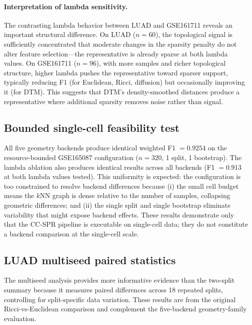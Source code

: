 \documentclass[11pt]{article}
\begin{document}
\paragraph{Interpretation of lambda sensitivity.}
The contrasting lambda behavior between LUAD and GSE161711 reveals an important structural difference.
On LUAD ($n = 60$), the topological signal is sufficiently concentrated that moderate changes in the sparsity penalty do not alter feature selection---the representative is already sparse at both lambda values.
On GSE161711 ($n = 96$), with more samples and richer topological structure, higher lambda pushes the representative toward sparser support, typically reducing F1 (for Euclidean, Ricci, diffusion) but occasionally improving it (for DTM).
This suggests that DTM's density-smoothed distances produce a representative where additional sparsity removes noise rather than signal.

\subsection{Bounded single-cell feasibility test}

All five geometry backends produce identical weighted F1 $= 0.9254$ on the resource-bounded GSE165087 configuration ($n = 320$, 1 split, 1 bootstrap).
The lambda ablation also produces identical results across all backends (F1 $= 0.913$ at both lambda values tested).
This uniformity is expected: the configuration is too constrained to resolve backend differences because (i) the small cell budget means the $k$NN graph is dense relative to the number of samples, collapsing geometric differences; and (ii) the single split and single bootstrap eliminate variability that might expose backend effects.
These results demonstrate only that the CC-SPR pipeline is executable on single-cell data; they do not constitute a backend comparison at the single-cell scale.

\subsection{LUAD multiseed paired statistics}

The multiseed analysis provides more informative evidence than the two-split summary because it measures paired differences across 18 repeated splits, controlling for split-specific data variation.
These results are from the original Ricci-vs-Euclidean comparison and complement the five-backend geometry-family evaluation.
\end{document}
